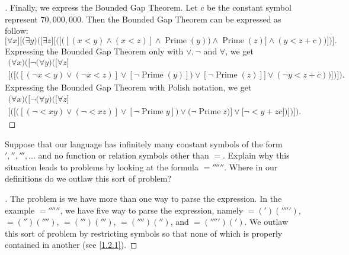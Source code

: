 \begin{proof}[]
  Finally, we express the Bounded Gap Theorem.
  Let \(c\) be the constant symbol represent \(70,000,000\).
  Then the Bounded Gap Theorem can be expressed as follow:
  \[
    \bigg[\forall x\bigg]\bigg[\bigg(\exists y\bigg)\bigg(\Big[\exists z\Big]\Big[\Big(\big[\big([(x < y) \land (x < z)] \land \operatorname{Prime}(y)\big) \land \operatorname{Prime}(z)\big] \land (y < z + c)\Big)\Big]\bigg)\bigg].
  \]
  Expressing the Bounded Gap Theorem only with \(\lor, \lnot\) and \(\forall\), we get
  \begin{multline*}
    \Bigg(\forall x\Bigg)\Bigg(\bigg[\lnot \bigg(\forall y\bigg)\bigg(\Big[\forall z\Big] \\
        \Big[\Big(\big[\big([(\lnot x < y) \lor (\lnot x < z)] \lor [\lnot \operatorname{Prime}(y)]\big) \lor [\lnot \operatorname{Prime}(z)]\big] \lor (\lnot y < z + c)\Big)\Big]
        \bigg)\bigg]\Bigg).
  \end{multline*}
  Expressing the Bounded Gap Theorem with Polish notation, we get
  \begin{multline*}
    \Bigg(\forall x\Bigg)\Bigg(\bigg[\lnot \bigg(\forall y\bigg)\bigg(\Big[\forall z\Big] \\
        \Big[\Big(\big[\big([(\lnot < x y) \lor (\lnot < x z)] \lor [\lnot \operatorname{Prime} y]\big) \lor \big(\lnot \operatorname{Prime} z\big)\big] \lor \big[\lnot < y + z c\big]\Big)\Big]
        \bigg)\bigg]\Bigg).
  \end{multline*}
\end{proof}

\begin{ex}\label{ex:1.3.4}
  Suppose that our language has infinitely many constant symbols of the form \(', '', ''', \dots\) and no function or relation symbols other than \(=\).
  Explain why this situation leads to problems by looking at the formula \(=''''''\).
  Where in our definitions do we outlaw this sort of problem?
\end{ex}

\begin{proof}[]
  The problem is we have more than one way to parse the expression.
  In the example \(=''''''\), we have five way to parse the expression, namely \(=(')(''''')\), \(=('')('''')\), \(=(''')(''')\), \(=('''')('')\), and \(=(''''')(')\).
  We outlaw this sort of problem by restricting symbols so that none of which is properly contained in another (see \cref{1.2.1}).
\end{proof}
